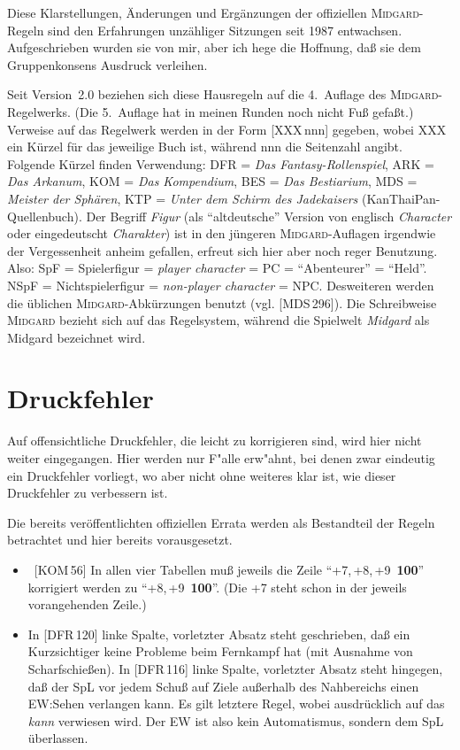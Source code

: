 \documentclass[10pt,a4paper,germanpar]{article}
\begin{document}
Diese Klarstellungen, Änderungen und Ergänzungen der offiziellen
\textsc{Midgard}-Regeln sind den Erfahrungen un\-zäh\-liger Sitzungen
seit 1987 entwachsen. Aufgeschrieben wurden sie von mir, aber ich hege die
Hoffnung, daß sie dem Gruppenkonsens Ausdruck verleihen.

Seit Version~2.0 beziehen sich diese Hausregeln auf die 4.~Auflage des
\textsc{Midgard}-Regelwerks. (Die 5.~Auflage hat in meinen Runden noch
nicht Fuß gefaßt.) Verweise auf das Regelwerk werden in der Form
[XXX\,nnn] gegeben, wobei XXX ein Kürzel für das jeweilige Buch ist,
während nnn die Seitenzahl angibt. Folgende Kürzel finden Verwendung:
DFR = \emph{Das Fantasy-Rollenspiel}, ARK = \emph{Das Arkanum}, KOM =
\emph{Das Kompendium}, BES = \emph{Das Bestiarium}, MDS =
\emph{Meister der Sphären}, KTP = \emph{Unter dem Schirm des
  Jadekaisers} (KanThaiPan-Quellenbuch). Der Begriff \emph{Figur} (als
"`altdeutsche"' Version von englisch \emph{Character} oder
eingedeutscht \emph{Charakter}) ist in den jüngeren
\textsc{Midgard}-Auflagen irgendwie der Vergessenheit anheim gefallen,
erfreut sich hier aber noch reger Benutzung. Also: SpF = Spielerfigur
= \emph{player character} = PC = "`Abenteurer"' = "`Held"'. NSpF =
Nichtspielerfigur = \emph{non-player character} = NPC. Desweiteren
werden die üblichen \textsc{Midgard}-Abkürzungen benutzt
(vgl. [MDS\,296]). Die Schreibweise \textsc{Midgard} bezieht sich auf
das Regelsystem, während die Spielwelt \emph{Midgard} als Midgard
bezeichnet wird.


\section{Druckfehler}

Auf offensichtliche Druckfehler, die leicht zu korrigieren sind, wird
hier nicht weiter eingegangen. Hier werden nur F"alle erw"ahnt, bei
denen zwar eindeutig ein Druckfehler vorliegt, wo aber nicht ohne
weiteres klar ist, wie dieser Druckfehler zu verbessern ist.

Die bereits veröffentlichten offiziellen Errata werden als Bestandteil
der Regeln betrachtet und hier bereits vorausgesetzt.

\begin{itemize}
\item\ [KOM\,56] In allen vier Tabellen muß jeweils die Zeile
  "`+7,\,+8,\,+9~\textbf{100}"' korrigiert werden zu
  "`+8,\,+9~\textbf{100}"'. (Die +7 steht schon in der jeweils
  vorangehenden Zeile.) 
\item In [DFR\,120] linke Spalte, vorletzter Absatz steht geschrieben, daß ein
  Kurzsichtiger keine Probleme beim Fernkampf hat (mit Ausnahme von
  Scharfschießen).  In [DFR\,116] linke Spalte, vorletzter Absatz steht
  hingegen, daß der SpL vor jedem Schuß auf Ziele außerhalb des
  Nahbereichs einen EW:Sehen verlangen kann. Es gilt letztere Regel, wobei
  ausdrücklich auf das \emph{kann} verwiesen wird.  Der EW ist also kein
  Automatismus, sondern dem SpL überlassen.
\end{itemize}
\end{document}
